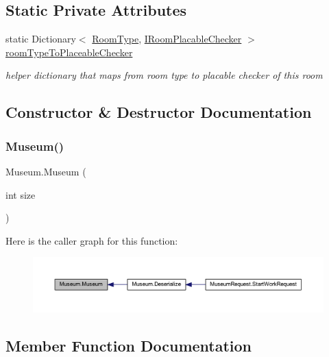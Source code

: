 \subsection*{Static Private Attributes}
\begin{DoxyCompactItemize}
\item 
static Dictionary$<$ \mbox{\hyperlink{_room_8cs_ab540f7414f306325d92272bcef1e34e1}{Room\+Type}}, \mbox{\hyperlink{interface_i_room_placable_checker}{I\+Room\+Placable\+Checker}} $>$ \mbox{\hyperlink{class_museum_af3826f71fcb80bd1bf30f5fbf75b5e28}{room\+Type\+To\+Placeable\+Checker}}
\begin{DoxyCompactList}\small\item\em helper dictionary that maps from room type to placable checker of this room \end{DoxyCompactList}\end{DoxyCompactItemize}


\subsection{Constructor \& Destructor Documentation}
\mbox{\label{class_museum_aa946df02a55ba522f7a39ac688648733}} 
\subsubsection{\texorpdfstring{Museum()}{Museum()}}
{\footnotesize\ttfamily Museum.\+Museum (\begin{DoxyParamCaption}\item[{int}]{size }\end{DoxyParamCaption})}

Here is the caller graph for this function\+:
\nopagebreak
\begin{figure}[H]
\begin{center}
\leavevmode
\includegraphics[width=350pt]{class_museum_aa946df02a55ba522f7a39ac688648733_icgraph}
\end{center}
\end{figure}


\subsection{Member Function Documentation}
\mbox{\label{class_museum_a4317c41f1bef1ffeee3678f5c342c9aa}} 
